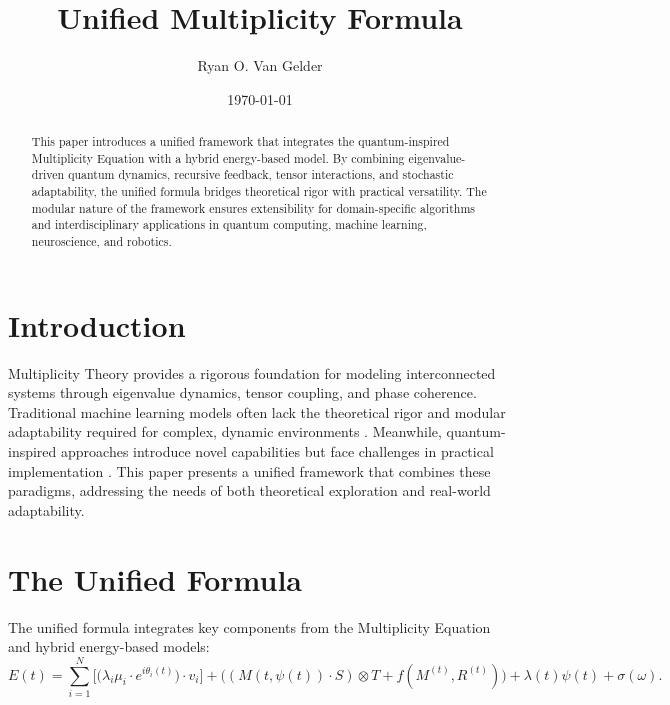 \documentclass{article}
\theoremstyle{plain}
\begin{document}
\title{Unified Multiplicity Formula}

\author{Ryan O. Van Gelder}
\date{\today}

\maketitle

\begin{abstract}
This paper introduces a unified framework that integrates the quantum-inspired Multiplicity Equation with a hybrid energy-based model. By combining eigenvalue-driven quantum dynamics, recursive feedback, tensor interactions, and stochastic adaptability, the unified formula bridges theoretical rigor with practical versatility. The modular nature of the framework ensures extensibility for domain-specific algorithms and interdisciplinary applications in quantum computing, machine learning, neuroscience, and robotics.
\end{abstract}

\section{Introduction}
Multiplicity Theory provides a rigorous foundation for modeling interconnected systems through eigenvalue dynamics, tensor coupling, and phase coherence. Traditional machine learning models often lack the theoretical rigor and modular adaptability required for complex, dynamic environments \cite{hinton2006reducing}. Meanwhile, quantum-inspired approaches introduce novel capabilities but face challenges in practical implementation \cite{schuld2019quantum}. This paper presents a unified framework that combines these paradigms, addressing the needs of both theoretical exploration and real-world adaptability.

\section{The Unified Formula}
The unified formula integrates key components from the Multiplicity Equation and hybrid energy-based models:
\begin{equation}
    E(t) = \sum_{i=1}^N \Big[\big(\lambda_i \mu_i \cdot e^{i \theta_i(t)} \big) \cdot v_i \Big] 
    + \Big((M(t, \psi(t)) \cdot S) \otimes T + f(M^{(t)}, R^{(t)})\Big) + \lambda(t) \psi(t) + \sigma(\omega).
\end{equation}
\end{document}
